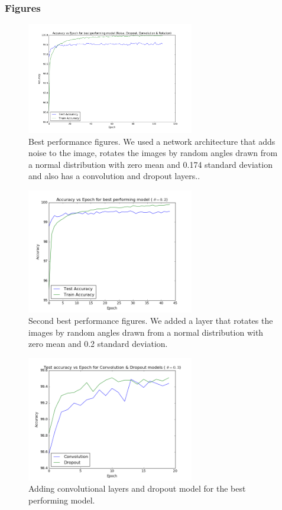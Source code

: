 \documentclass{article}
\begin{document}
\subsubsection{Figures}
\begin{figure}[ht!]
  \centering
  \includegraphics[width=0.65\textwidth]{topperformance}
  \caption{Best performance figures. We used a network architecture that adds noise to the image, rotates the images by random angles drawn from a normal distribution with zero mean and 0.174 standard deviation and also has a convolution and dropout layers..\label{fig:top_performance}}
\end{figure}
\begin{figure}[ht!]
  \centering
  \includegraphics[width=0.65\textwidth]{bestPerformance}
  \caption{Second best performance figures. We added a layer that rotates the images by random angles drawn from a normal distribution with zero mean and 0.2 standard deviation. \label{fig:best_performance}}
\end{figure}
\begin{figure}[ht!]
  \centering
  \includegraphics[width=0.65\textwidth]{convolution_dropout}
  \caption{Adding convolutional layers and dropout model for the best performing model. \label{fig:convolution_dropout}}
\end{figure}
\end{document}
